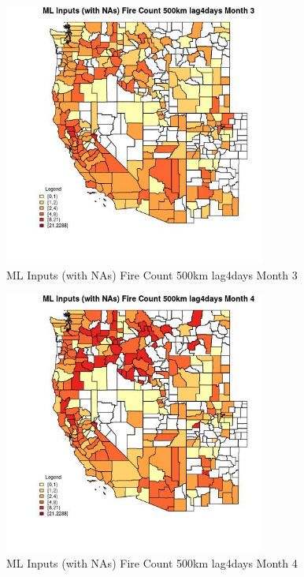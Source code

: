 \clearpage 

\begin{figure} 
\centering  
\includegraphics[width=0.77\textwidth]{Code_Outputs/Report_ML_input_PM25_Step4_part_e_de_duplicated_aves_compiled_2019-05-21wNAs_CountyFire_Count_500km_lag4daysmedianMonth3.jpg} 
\caption{\label{fig:Report_ML_input_PM25_Step4_part_e_de_duplicated_aves_compiled_2019-05-21wNAsCountyFire_Count_500km_lag4daysmedianMonth3}ML Inputs (with NAs) Fire Count 500km lag4days Month 3} 
\end{figure} 
 

\begin{figure} 
\centering  
\includegraphics[width=0.77\textwidth]{Code_Outputs/Report_ML_input_PM25_Step4_part_e_de_duplicated_aves_compiled_2019-05-21wNAs_CountyFire_Count_500km_lag4daysmedianMonth4.jpg} 
\caption{\label{fig:Report_ML_input_PM25_Step4_part_e_de_duplicated_aves_compiled_2019-05-21wNAsCountyFire_Count_500km_lag4daysmedianMonth4}ML Inputs (with NAs) Fire Count 500km lag4days Month 4} 
\end{figure} 
 


